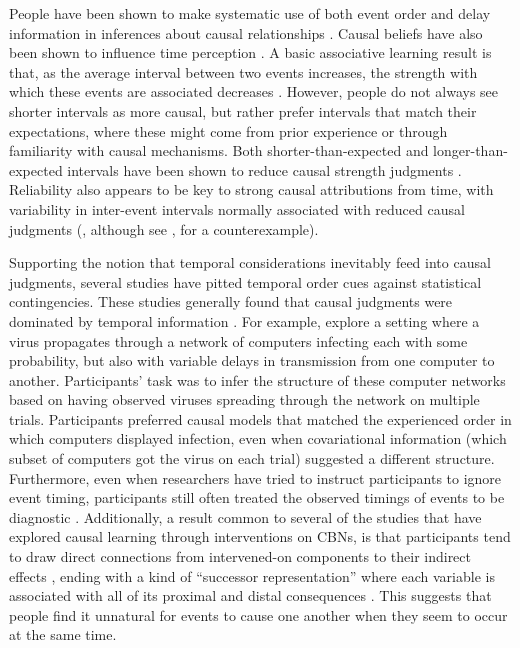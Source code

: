 \documentclass{cambridge7A}%
\begin{document}
People have been shown to make systematic use of both event order \citep{bramley2014order} and delay information in inferences about causal relationships \citep{buehner2003rethinking,buehner2004abolishing,buehner2006temporal}. Causal beliefs have also been shown to influence time perception \citep{bechlivanidis2013does,buehner2009causal,haggard2002voluntary}.  A basic associative learning result is that, as the average interval between two events increases, the strength with which these events are associated decreases \citep{wolfe1921effect,shanks1987associative, grice1948relation}.  However, people do not always see shorter intervals as more causal, but rather prefer intervals that match their expectations, where these might come from prior experience or through familiarity with causal mechanisms.  
Both shorter-than-expected and longer-than-expected intervals have been shown to reduce causal strength judgments \citep{buehner2004abolishing, schlottmann1999seeing,buehner2002knowledge,greville2010temporal,hagmayer2002temporal,buehner2003rethinking,greville2016temporal}.  Reliability also appears to be key to strong causal attributions from time, with variability in inter-event intervals normally associated with reduced causal judgments (\citealp{greville2010temporal,lagnado2010influence,greville2013structural}, although see \citealp{young2009problem}, for a counterexample).

Supporting the notion that temporal considerations inevitably feed into causal judgments, several studies have pitted temporal order cues against statistical contingencies.  These studies generally found that causal judgments were dominated by temporal information \citep{lagnado2006time,lagnado2004advantage,burns2009temporal,schlottmann1999seeing,frosch2012causal}.  For example,  \cite{lagnado2006time} explore a setting where a virus propagates through a network of computers infecting each with some probability, but also with variable delays in transmission from one computer to another. Participants' task was to infer the structure of these computer networks based on having observed viruses spreading through the network on multiple trials.  Participants preferred causal models that matched the experienced order in which computers displayed infection, even when covariational information (which subset of computers got the virus on each trial) suggested a different structure.  Furthermore, even when researchers have tried to instruct participants to ignore event timing, participants still often treated the observed timings of events to be diagnostic \citep{white2006structure,mccormack2016children}.  Additionally, a result common to several of the studies that have explored causal learning through interventions on CBNs, is that participants tend to draw direct connections from intervened-on components to their indirect effects \citep{bramley2015fcs, bramley2017neurath, mccormack2016children, fernbach2009causal}, ending with a kind of ``successor representation'' where each variable is associated with all of its proximal and distal consequences \citep{dayan1993improving,momennejad2017successor}. This suggests that people find it unnatural for events to cause one another when they seem to occur at the same time. 
\end{document}
